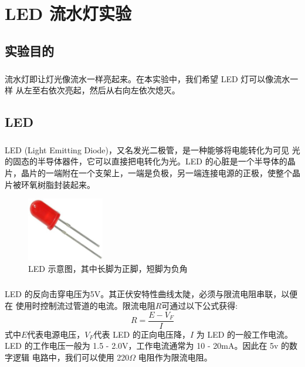 \documentclass[UTF8, oneside]{ctexbook}
\begin{document}
\chapter{LED 流水灯实验}

\section{实验目的}
\paragraph{}
流水灯即让灯光像流水一样亮起来。在本实验中，我们希望 LED 灯可以像流水一样
从左至右依次亮起，然后从右向左依次熄灭。

\section{LED}
\paragraph{}
LED (Light Emitting Diode)，又名发光二极管，是一种能够将电能转化为可见
光的固态的半导体器件，它可以直接把电转化为光。LED 的心脏是一个半导体的晶
片，晶片的一端附在一个支架上，一端是负极，另一端连接电源的正极，使整个晶
片被环氧树脂封装起来。
\begin{figure}[h]
    \centering
    \includegraphics[width=0.3\textwidth]{./result/basic/2/led.png}
    \caption{LED 示意图，其中长脚为正脚，短脚为负角}
    \label{led}
\end{figure}

\paragraph{}
LED 的反向击穿电压为5V。其正伏安特性曲线太陡，必须与限流电阻串联，以便在
使用时控制流过管道的电流。限流电阻$R$可通过以下公式获得:
\begin{equation*}
    R = \frac{E-V_F}{I}
\end{equation*}
式中$E$代表电源电压，$V_F$代表 LED 的正向电压降，$I$ 为 LED 的一般工作电流。
LED 的工作电压一般为 1.5 - 2.0V，工作电流通常为 10 - 20mA。因此在 5v 的数字逻辑
电路中，我们可以使用 220$\Omega$ 电阻作为限流电阻。
\end{document}
